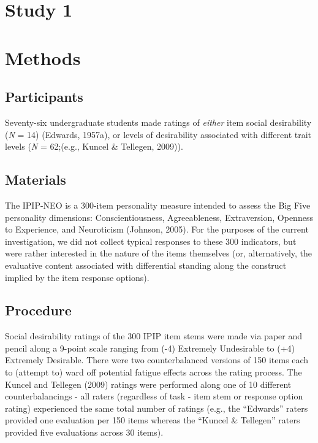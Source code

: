 \documentclass[
  english,
  ,jou]{apa6}
\begin{document}
\hypertarget{study-1}{%
\section{Study 1}\label{study-1}}

\hypertarget{methods}{%
\section{Methods}\label{methods}}

\hypertarget{participants}{%
\subsection{Participants}\label{participants}}

Seventy-six undergraduate students made ratings of \emph{either} item social desirability (\emph{N} = 14) (Edwards, 1957a), or levels of desirability associated with different trait levels (\emph{N} = 62;(e.g., Kuncel \& Tellegen, 2009)).

\hypertarget{materials}{%
\subsection{Materials}\label{materials}}

The IPIP-NEO is a 300-item personality measure intended to assess the Big Five personality dimensions: Conscientiousness, Agreeableness, Extraversion, Openness to Experience, and Neuroticism (Johnson, 2005). For the purposes of the current investigation, we did not collect typical responses to these 300 indicators, but were rather interested in the nature of the items themselves (or, alternatively, the evaluative content associated with differential standing along the construct implied by the item response options).

\hypertarget{procedure}{%
\subsection{Procedure}\label{procedure}}

Social desirability ratings of the 300 IPIP item stems were made via paper and pencil along a 9-point scale ranging from (-4) Extremely Undesirable to (+4) Extremely Desirable. There were two counterbalanced versions of 150 items each to (attempt to) ward off potential fatigue effects across the rating process. The Kuncel and Tellegen (2009) ratings were performed along one of 10 different counterbalancings - all raters (regardless of task - item stem or response option rating) experienced the same total number of ratings (e.g., the \enquote{Edwards} raters provided one evaluation per 150 items whereas the \enquote{Kuncel \& Tellegen} raters provided five evaluations across 30 items).
\end{document}
